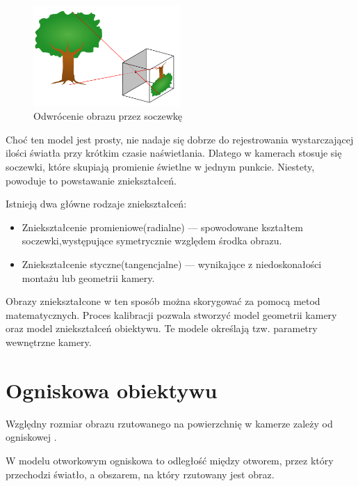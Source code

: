 \documentclass[magisterska]{pracadypl}
\begin{document}
\begin{figure}[H]
    \centering
    \includegraphics[width=0.5\textwidth]{images/light.png}
    \captionsetup{font=footnotesize}
    \caption[Odwrócenie obrazu przez soczewkę. https://funsizephysics.com/use-light-turn-world-upside/]{Odwrócenie obrazu przez soczewkę}
    \label{fig:rpi}
\end{figure}

Choć ten model jest prosty, nie nadaje się dobrze do rejestrowania wystarczającej ilości światła przy krótkim czasie naświetlania. Dlatego w kamerach stosuje się soczewki, które skupiają promienie świetlne w jednym punkcie. Niestety, powoduje to powstawanie zniekształceń.

Istnieją dwa główne rodzaje zniekształceń:

\begin{itemize}
  \item Zniekształcenie promieniowe(radialne) — spowodowane kształtem soczewki,występujące symetrycznie względem środka obrazu.

  \item Zniekształcenie styczne(tangencjalne) — wynikające z niedoskonałości montażu lub geometrii kamery.
\end{itemize}

Obrazy zniekształcone w ten sposób można skorygować za pomocą metod matematycznych. Proces kalibracji pozwala stworzyć model geometrii kamery oraz model zniekształceń obiektywu. Te modele określają tzw. parametry wewnętrzne kamery.

\section{Ogniskowa obiektywu}

Względny rozmiar obrazu rzutowanego na powierzchnię w kamerze zależy od ogniskowej \cite{ogniskowa}.

W modelu otworkowym ogniskowa to odległość między otworem, przez który przechodzi światło, a obszarem, na który rzutowany jest obraz.
\end{document}
